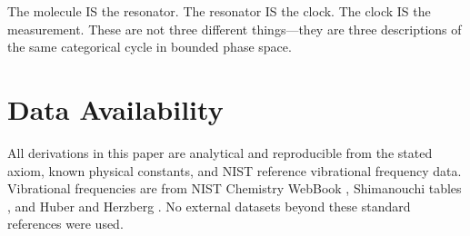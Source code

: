 \documentclass[11pt,twocolumn,a4paper]{article}
\theoremstyle{definition}
\theoremstyle{remark}
\begin{document}
The molecule IS the resonator. The resonator IS the clock. The clock IS the measurement. These are not three different things---they are three descriptions of the same categorical cycle in bounded phase space.

\section*{Data Availability}

All derivations in this paper are analytical and reproducible from the stated axiom, known physical constants, and NIST reference vibrational frequency data. Vibrational frequencies are from NIST Chemistry WebBook \citep{nist_webbook}, Shimanouchi tables \citep{shimanouchi1972}, and Huber and Herzberg \citep{huber1979}. No external datasets beyond these standard references were used.



\end{document}
